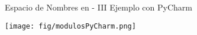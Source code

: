 \documentclass[10pt,envcountsect,spanish]{beamer}
\begin{document}
\begin{frame}{Espacio de Nombres en  - III } 
{Ejemplo con PyCharm}

\centerline{\texttt{[image: fig/modulosPyCharm.png]}}

\end{frame}






\end{document}
